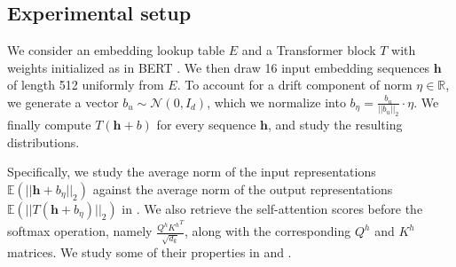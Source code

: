 \subsection{Experimental setup}
We consider an embedding lookup table $E$ and a Transformer block $T$ with weights initialized as in BERT \citep{devlin-etal-2019-bert}. We then draw 16 input embedding sequences $\mathbf{h}$ of length 512 uniformly from $E$. To account for a drift component of norm $\eta \in\mathbb{R}$, we generate a vector $b_u \sim \mathcal{N}(0, I_d)$, which we normalize into $b_\eta = \frac{b_u}{||b_u||_2}\cdot \eta$. We finally compute $T(\mathbf{h} + b)$ for every sequence $\mathbf{h}$, and study the resulting distributions.

Specifically, we study the average norm of the input representations $\mathbb{E}(||\mathbf{h} + b_\eta||_2)$ against the average norm of the output representations $\mathbb{E}(||T(\mathbf{h} + b_\eta)||_2)$ in . We also retrieve the self-attention scores before the softmax operation, namely $\frac{Q^h{K^h}^T}{\sqrt{d_k}}$, along with the corresponding $Q^h$ and $K^h$ matrices. We study some of their properties in  and .

